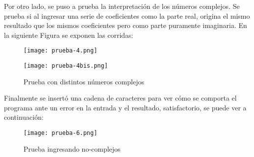 Por otro lado, se puso a prueba la interpretación de los números complejos. Se prueba si al ingresar una serie de coeficientes como la parte real, origina el mismo resultado que los mismos coeficientes pero como parte puramente imaginaria. En la siguiente Figura se exponen las corridas:

\begin{figure}[H]
	\centering
		\texttt{[image: prueba-4.png]}
\end{figure}
\begin{figure}[H]
	\centering
		\texttt{[image: prueba-4bis.png]}
	\caption{Prueba con distintos números complejos}
	\label{fig:prueba-4}
\end{figure}

Finalmente se insertó una cadena de caracteres para ver cómo se comporta el programa ante un error en la entrada y el resultado, satisfactorio, se puede ver a continuación:

\begin{figure}[H]
	\centering
		\texttt{[image: prueba-6.png]}
	\caption{Prueba ingresando no-complejos}
	\label{fig:prueba-6}
\end{figure}


